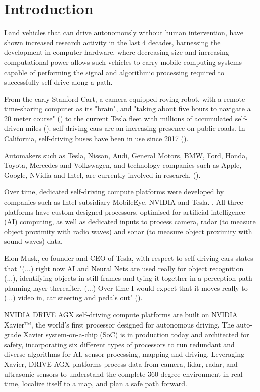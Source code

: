 
\section{Introduction}

Land vehicles that can drive autonomously without human intervention, have shown increased research activity in the last 4 decades, harnessing the development in computer hardware, where decreasing size and increasing computational power allows such vehicles to carry mobile computing systems capable of performing the signal and algorithmic processing required to successfully self-drive along a path.
  
From the early Stanford Cart, a camera-equipped roving robot, with a remote time-sharing computer as its "brain", and "taking about five hours to navigate a 20 meter course" (\cite{3899}) to the current Tesla fleet with millions of accumulated self-driven miles (\cite{citation needed}). self-driving cars are an increasing presence on public roads. In California, self-driving buses have been in use since 2017 (\cite{Citation Needed}).

Automakers such as Tesla, Nissan, Audi, General Motors, BMW, Ford, Honda, Toyota, Mercedes and Volkswagen, and technology companies such as Apple, Google, NVidia and Intel, are currently involved in research. (\cite{app10082749}).

Over time, dedicated self-driving compute platforms were developed by companies such as Intel subsidiary MobileEye, NVIDIA and Tesla. \cite{NVIDIA}. All three platforms have custom-designed processors, optimised for artificial intelligence (AI) computing, as well as dedicated inputs to process camera, radar (to measure object proximity with radio waves) and sonar (to measure object proximity with sound waves) data.

Elon Musk, co-founder and CEO of Tesla, with respect to self-driving cars states that  "(...) right now AI and Neural Nets are used really for object recognition (...), identifying objects in still frames and tying it together in a perception path planning layer thereafter. (...) Over time I would expect that it moves really to (...) video in, car steering and pedals out" (\cite{TESLAADE:2019}).




NVIDIA DRIVE AGX self-driving compute platforms are built on NVIDIA Xavier™, the world’s first processor designed for autonomous driving. The auto-grade Xavier system-on-a-chip (SoC) is in production today and architected for safety, incorporating six different types of processors to run redundant and diverse algorithms for AI, sensor processing, mapping and driving. Leveraging Xavier, DRIVE AGX platforms process data from camera, lidar, radar, and ultrasonic sensors to understand the complete 360-degree environment in real-time, localize itself to a map, and plan a safe path forward.

